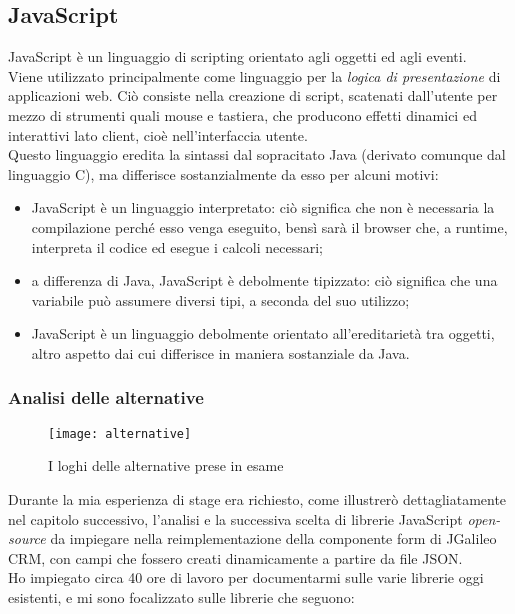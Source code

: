 \subsection{JavaScript}
JavaScript è un linguaggio di scripting orientato agli oggetti ed agli eventi.\\
Viene utilizzato principalmente come linguaggio per la \emph{logica di presentazione} di applicazioni web. Ciò consiste nella creazione di \gls{script}\glsfirstoccur, scatenati dall'utente per mezzo di strumenti quali mouse e tastiera, che producono effetti dinamici ed interattivi lato client, cioè nell'interfaccia utente.\\
Questo linguaggio eredita la sintassi dal sopracitato Java (derivato comunque dal linguaggio C), ma differisce sostanzialmente da esso per alcuni motivi:
\begin{itemize}
	\item JavaScript è un linguaggio interpretato: ciò significa che non è necessaria la compilazione perché esso venga eseguito, bensì sarà il browser che, a runtime, interpreta il codice ed esegue i calcoli necessari;\\
	\item a differenza di Java, JavaScript è debolmente tipizzato: ciò significa che una variabile può assumere diversi tipi, a seconda del suo utilizzo;\\
	\item JavaScript è un linguaggio debolmente orientato all'ereditarietà tra oggetti, altro aspetto dai cui differisce in maniera sostanziale da Java. \\
\end{itemize}

\newpage

\subsubsection{Analisi delle alternative}

\begin{figure}[h]
	\centering
	\texttt{[image: alternative]}
	\caption{I loghi delle alternative prese in esame}
\end{figure}

Durante la mia esperienza di stage era richiesto, come illustrerò dettagliatamente nel capitolo successivo, l'analisi e la successiva scelta di librerie JavaScript \emph{open-source} da impiegare nella reimplementazione della componente form di JGalileo CRM, con campi che fossero creati dinamicamente a partire da file JSON. \\ 
Ho impiegato circa 40 ore di lavoro per documentarmi sulle varie librerie oggi esistenti, e mi sono focalizzato sulle librerie che seguono:
